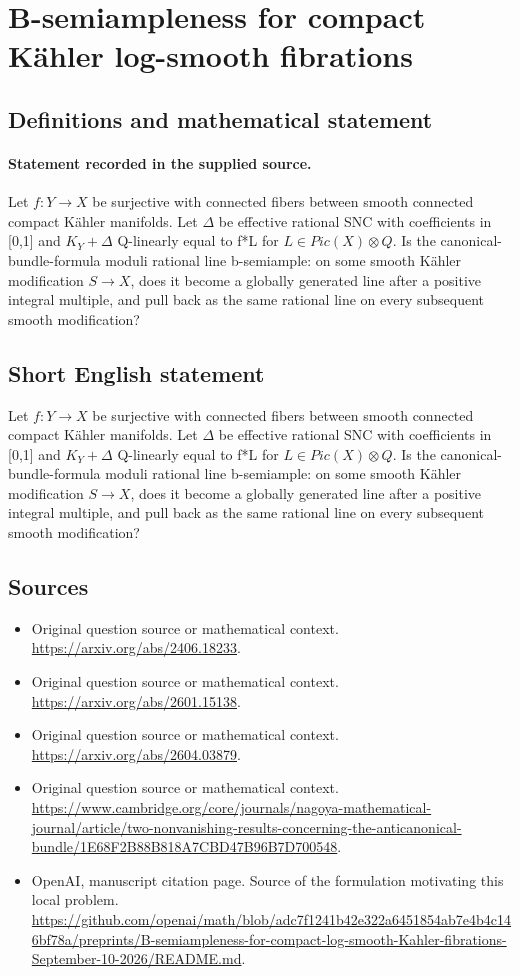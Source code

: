 \documentclass[11pt]{article}
\begin{document}
\section*{B-semiampleness for compact Kähler log-smooth fibrations}\label{30007039}
\subsection{Definitions and mathematical statement}
\paragraph{Statement recorded in the supplied source.}
Let $f:Y\to X$ be surjective with connected fibers between smooth connected compact Kähler manifolds. Let $\Delta $ be effective rational SNC with coefficients in [0,1] and $K_Y+\Delta $ Q-linearly equal to f*L for $L\in Pic(X)\otimes Q$. Is the canonical-bundle-formula moduli rational line b-semiample: on some smooth Kähler modification $S\to X$, does it become a globally generated line after a positive integral multiple, and pull back as the same rational line on every subsequent smooth modification?
\subsection{Short English statement}
Let $f:Y\to X$ be surjective with connected fibers between smooth connected compact Kähler manifolds. Let $\Delta $ be effective rational SNC with coefficients in [0,1] and $K_Y+\Delta $ Q-linearly equal to f*L for $L\in Pic(X)\otimes Q$. Is the canonical-bundle-formula moduli rational line b-semiample: on some smooth Kähler modification $S\to X$, does it become a globally generated line after a positive integral multiple, and pull back as the same rational line on every subsequent smooth modification?
\subsection{Sources}
\begin{itemize}
\item[S1] Original question source or mathematical context.
\url{https://arxiv.org/abs/2406.18233}.
\item[S2] Original question source or mathematical context.
\url{https://arxiv.org/abs/2601.15138}.
\item[S3] Original question source or mathematical context.
\url{https://arxiv.org/abs/2604.03879}.
\item[S4] Original question source or mathematical context.
\url{https://www.cambridge.org/core/journals/nagoya-mathematical-journal/article/two-nonvanishing-results-concerning-the-anticanonical-bundle/1E68F2B88B818A7CBD47B96B7D700548}.
\item[S5] OpenAI, manuscript citation page. Source of the formulation motivating this local problem.
\url{https://github.com/openai/math/blob/adc7f1241b42e322a6451854ab7e4b4c146bf78a/preprints/B-semiampleness-for-compact-log-smooth-Kahler-fibrations-September-10-2026/README.md}.
\end{itemize}
\end{document}
